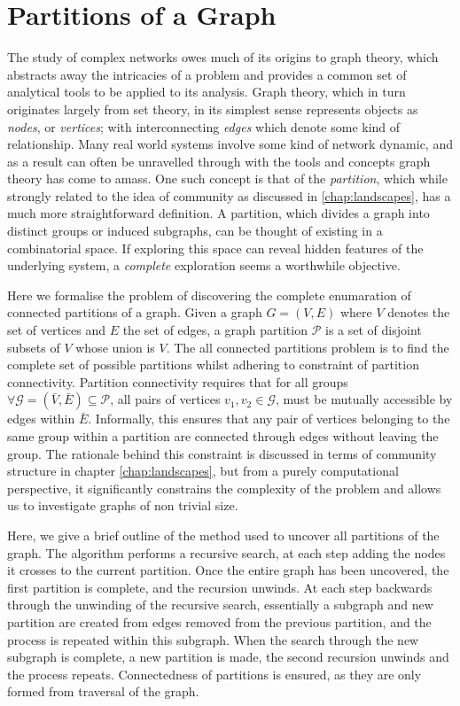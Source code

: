 \chapter{Partitions of a Graph}
\label{sec:partitionsOfaGraph}

The study of complex networks owes much of its origins to graph theory, which abstracts away the intricacies of a problem and provides a  common set of analytical tools to be applied to its analysis.  Graph theory, which in turn originates largely from set theory, in its simplest sense represents objects as \textit{nodes}, or \textit{vertices}; with interconnecting \textit{edges} which denote some kind of relationship.  Many real world systems involve some kind of network dynamic, and as a result can often be unravelled through with the tools and concepts graph theory has come to amass.  One such concept is that of the \textit{partition}, which while strongly related to the idea of community as discussed in \ref{chap:landscapes}, has a much more straightforward definition.  A partition, which divides a graph into distinct groups or induced subgraphs, can be thought of existing in a combinatorial space.  If exploring this space can reveal hidden features of the underlying system, a \textit{complete} exploration seems a worthwhile objective.

Here we formalise the problem of discovering the complete enumaration of connected partitions of a graph.  Given a graph $G=(V,E)$ where $V$ denotes the set of vertices and $E$ the set of edges, a graph partition $\mathcal{P}$ is a set of disjoint subsets of $V$ whose union is $V$.  The all connected partitions problem is to find the complete set of possible partitions whilst adhering to constraint of partition connectivity.  Partition connectivity requires that for all groups $\forall \mathcal{G}=(\bar{V},\bar{E})\subseteq \mathcal{P}$, all pairs of vertices $v_1,v_2 \in \mathcal{G}$, must be mutually accessible by edges within $\bar{E}$.  Informally, this ensures that any pair of vertices belonging to the same group within a partition are connected through edges without leaving the group.  The rationale behind this constraint is discussed in terms of community structure in chapter \ref{chap:landscapes}, but from a purely computational perspective, it significantly constrains the complexity of the problem and allows us to investigate graphs of non trivial size.

Here, we give a brief outline of the method used to uncover all partitions of the graph.  The algorithm performs a recursive search, at each step adding the nodes it crosses to the current partition.  Once the entire graph has been uncovered, the first partition is complete, and the recursion unwinds.  At each step backwards through the unwinding of the recursive search, essentially a subgraph and new partition are created from edges removed from the previous partition, and the process is repeated within this subgraph.  When the search through the new subgraph is complete, a new partition is made, the second recursion unwinds and the process repeats.  Connectedness of partitions is ensured, as they are only formed from traversal of the graph.

